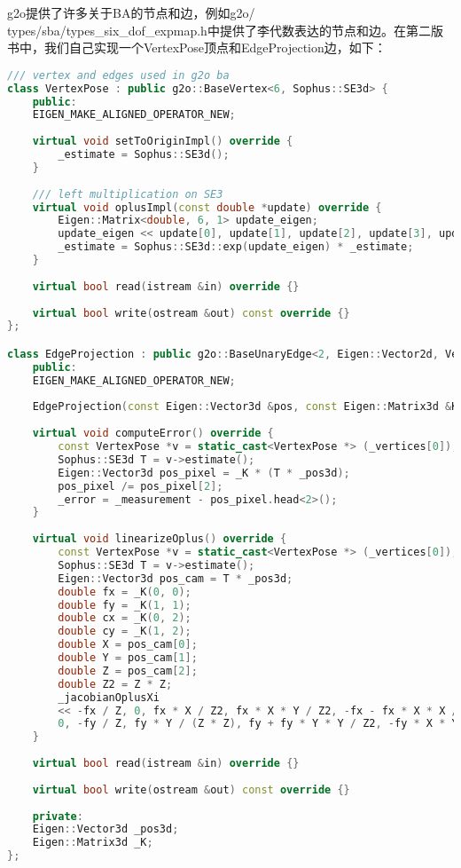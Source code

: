 g2o提供了许多关于BA的节点和边，例如g2o/\\types/sba/types\_six\_dof\_expmap.h中提供了李代数表达的节点和边。在第二版书中，我们自己实现一个VertexPose顶点和EdgeProjection边，如下：
\begin{lstlisting}[language=c++,caption=slambook2/ch7/pose_estimation_3d2d.cpp（片段）]
/// vertex and edges used in g2o ba
class VertexPose : public g2o::BaseVertex<6, Sophus::SE3d> {
	public:
	EIGEN_MAKE_ALIGNED_OPERATOR_NEW;
	
	virtual void setToOriginImpl() override {
		_estimate = Sophus::SE3d();
	}
	
	/// left multiplication on SE3
	virtual void oplusImpl(const double *update) override {
		Eigen::Matrix<double, 6, 1> update_eigen;
		update_eigen << update[0], update[1], update[2], update[3], update[4], update[5];
		_estimate = Sophus::SE3d::exp(update_eigen) * _estimate;
	}
	
	virtual bool read(istream &in) override {}
	
	virtual bool write(ostream &out) const override {}
};

class EdgeProjection : public g2o::BaseUnaryEdge<2, Eigen::Vector2d, VertexPose> {
	public:
	EIGEN_MAKE_ALIGNED_OPERATOR_NEW;
	
	EdgeProjection(const Eigen::Vector3d &pos, const Eigen::Matrix3d &K) : _pos3d(pos), _K(K) {}
	
	virtual void computeError() override {
		const VertexPose *v = static_cast<VertexPose *> (_vertices[0]);
		Sophus::SE3d T = v->estimate();
		Eigen::Vector3d pos_pixel = _K * (T * _pos3d);
		pos_pixel /= pos_pixel[2];
		_error = _measurement - pos_pixel.head<2>();
	}
	
	virtual void linearizeOplus() override {
		const VertexPose *v = static_cast<VertexPose *> (_vertices[0]);
		Sophus::SE3d T = v->estimate();
		Eigen::Vector3d pos_cam = T * _pos3d;
		double fx = _K(0, 0);
		double fy = _K(1, 1);
		double cx = _K(0, 2);
		double cy = _K(1, 2);
		double X = pos_cam[0];
		double Y = pos_cam[1];
		double Z = pos_cam[2];
		double Z2 = Z * Z;
		_jacobianOplusXi
		<< -fx / Z, 0, fx * X / Z2, fx * X * Y / Z2, -fx - fx * X * X / Z2, fx * Y / Z,
		0, -fy / Z, fy * Y / (Z * Z), fy + fy * Y * Y / Z2, -fy * X * Y / Z2, -fy * X / Z;
	}
	
	virtual bool read(istream &in) override {}
	
	virtual bool write(ostream &out) const override {}
	
	private:
	Eigen::Vector3d _pos3d;
	Eigen::Matrix3d _K;
};
\end{lstlisting}

